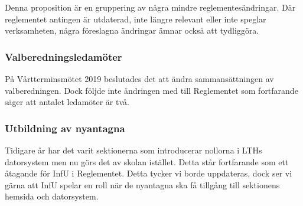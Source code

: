 \documentclass[../_main/handlingar.tex]{subfiles}
\begin{document}

Denna proposition är en gruppering av några mindre reglementesändringar. Där reglementet antingen är utdaterad, inte längre relevant eller inte speglar verksamheten, några föreslagna ändringar ämnar också att tydliggöra.

\subsubsection{Valberedningsledamöter} 

På Vårtterminsmötet 2019 beslutades det att ändra sammansättningen av valberedningen. 
Dock följde inte ändringen med till Reglementet som fortfarande säger att antalet ledamöter är två. 

\subsubsection{Utbildning av nyantagna} 

Tidigare år har det varit sektionerna som introducerar nollorna i LTHs datorsystem men nu görs det av skolan istället. 
Detta står fortfarande som ett åtagande för InfU i Reglementet. Detta tycker vi borde uppdateras, dock ser vi gärna att InfU spelar en roll när de nyantagna ska få tillgång till sektionens hemsida och datorsystem.
\end{document}
